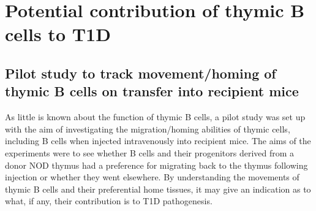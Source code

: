 \section{Potential contribution of thymic B cells to T1D}

\subsection{Pilot study to track movement/homing of thymic B cells on transfer into recipient mice}


As little is known about the function of thymic B cells, a pilot study was set up with the aim of investigating the migration/homing abilities of thymic cells, including B cells when injected intravenously into recipient mice.
The aims of the experiments were to see whether B cells and their progenitors derived from a donor NOD thymus had a preference for migrating back to the thymus following injection or whether they went elsewhere.
By understanding the movements of thymic B cells and their preferential home tissues, it may give an indication as to what, if any, their contribution is to T1D pathogenesis.

